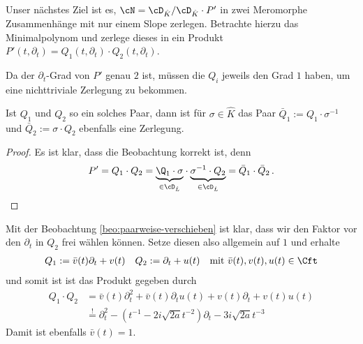 Unser nächstes Ziel ist es, $\cN=\cD_{\hat K}/\cD_{\hat K}\cdot P'$ in zwei
Meromorphe Zusammenhänge mit nur einem Slope zerlegen.  Betrachte hierzu das
Minimalpolynom und zerlege dieses in ein Produkt
$P'(t,\partial_t)=Q_1(t,\partial_t)\cdot Q_2(t,\partial_t)$.

Da der $\partial_t$-Grad von $P'$ genau $2$ ist, müssen die $Q_i$
jeweils den Grad $1$ haben, um eine nichttriviale Zerlegung zu bekommen.
\begin{beo} \label{beo:paarweise-verschieben}
Ist $Q_1$ und $Q_2$ so ein solches Paar, dann ist für $\sigma\in \hat K$ das
Paar $\bar Q_1:=Q_1\cdot \sigma^{-1}$ und $\bar Q_2:=\sigma\cdot Q_2$ ebenfalls
eine Zerlegung.
\end{beo}
\begin{proof}
Es ist klar, dass die Beobachtung korrekt ist, denn
\[
P'=Q_1\cdot Q_2=
\underset{\in\cD_{\hat L}}{\underbrace{
  \Q_1\cdot\sigma
}}
\cdot
\underset{\in\cD_{\hat L}}{\underbrace{
  \sigma^{-1}\cdot Q_2
}}
=\bar Q_1 \cdot \bar Q_2 \,.
\]
\end{proof}
Mit der Beobachtung \ref{beo:paarweise-verschieben} ist klar, dass wir
den Faktor vor den $\partial_t$ in $Q_2$ frei wählen können. Setze diesen
also allgemein auf $1$ und erhalte
\begin{align*}
Q_1&:=\bar v(t) \partial_t + v(t) & Q_2&:=\partial_t + u(t)
& \mbox{mit } \bar v(t), v(t), u(t)\in \Cft
\end{align*}
und somit ist ist das Produkt gegeben durch
\begin{equation} \label{eq:schritt100}
  \begin{aligned}
Q_1\cdot Q_2&=\bar v(t) \partial_t^2 + \bar v(t)\partial_t u(t) +
  v(t)\partial_t + v(t)u(t)
\\&\overset{!}{=} \partial_t^2 - (t^{-1} - 2i\sqrt{2a}t^{-2})\partial_t
  - 3 i\sqrt{2a}t^{-3}
  \end{aligned}
\end{equation}
Damit ist ebenfalls $\bar v(t)=1$.

